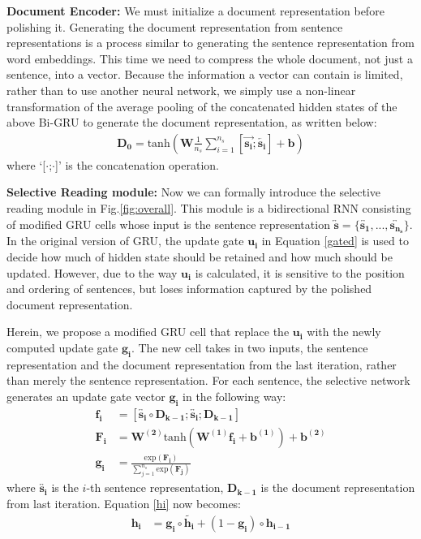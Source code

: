 \documentclass[11pt,a4paper]{article}
\begin{document}
\textbf{Document Encoder: } 
We must initialize a document representation before polishing it.
Generating the document representation from sentence representations is a process similar to generating the sentence representation from word embeddings. This time we need to compress the whole document, not just a sentence, into a vector.  
Because the information a vector can contain is limited, rather than to use another neural network, we simply use a non-linear transformation of the average pooling of the concatenated hidden states of the above Bi-GRU to generate the document representation, as written below:
\begin{align}
\bm{D_{0}}=\text{tanh}(\bm{W}\frac{1}{n_{s}}\sum^{n_{s}}_{i=1}[\bm{\overrightarrow{s_{i}}};\bm{\overleftarrow{s_{i}}}]+\bm{b})
\end{align}
where `[$\cdot$;$\cdot$]' is the concatenation operation.

\textbf{Selective Reading module: } 
Now we can formally introduce the selective reading module in Fig.\ref{fig:overall}. 
This module is a bidirectional RNN consisting of modified GRU cells whose input is the sentence representation $\bm{\overleftrightarrow{s}}=\{\bm{\overleftrightarrow{s_{1}}},...,\bm{\overleftrightarrow{s_{n_{s}}}}\}$.
In the original version of GRU, the update gate $\bm{u_{i}}$ in Equation \ref{gated} is used to decide how much of hidden state should be retained and how much should be updated. 
However, due to the way $\bm{u_{i}}$ is calculated, it is sensitive to the position and ordering of sentences, but loses information captured by the polished document representation.

Herein, we propose a modified GRU cell that replace the $\bm{u_{i}}$ with the newly computed update gate $\bm{g_{i}}$. The new cell takes in two inputs, the sentence representation and the document representation from the last iteration, rather than merely the sentence representation. For each sentence, the selective network generates an update gate vector $\bm{g_{i}}$ in the following way:
\begin{align}
\bm{f_{i}} & =[\bm{\overleftrightarrow{s_{i}}}\circ \bm{D_{k-1}}; \bm{\overleftrightarrow{s_{i}}}; \bm{D_{k-1}}] \\
\bm{F_{i}}& =\bm{W^{(2)}}\text{tanh}(\bm{W^{(1)}}\bm{f_{i}}+\bm{b^{(1)}})+\bm{b^{(2)}} \\
\bm{g_{i}}& =\frac{\text{exp}(\bm{F_{i}})}{\sum^{n_{s}}_{j=1}\text{exp}(\bm{F_{j}})}
\end{align}
where  $\bm{\overleftrightarrow{s_{i}}}$ is the $i$-th sentence representation, $\bm{D_{k-1}}$ is the document representation from last iteration. Equation \ref{hi} now becomes:
\begin{align}
\bm{h_{i}}&=\bm{g_{i}}\circ \bm{\tilde{{h_{i}}}}+(1-\bm{g_{i}})\circ \bm{h_{i-1} }
\end{align}
\end{document}
